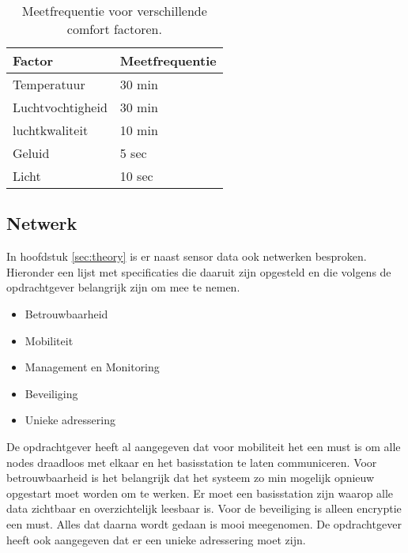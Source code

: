 \begin{table}[h]
    \centering
    \begin{tabular}{|l|l|}\hline
        Factor           & Meetfrequentie\\\hline
        Temperatuur      & 30 min        \\\hline
        Luchtvochtigheid & 30 min        \\\hline
        luchtkwaliteit   & 10 min        \\\hline
        Geluid           & 5 sec         \\\hline
        Licht            & 10 sec        \\\hline
    \end{tabular}
    \caption{Meetfrequentie voor verschillende comfort factoren.}
    \label{tabel:meetfrequentie}
\end{table}

\subsection{Netwerk}
In hoofdstuk \ref{sec:theory} is er naast sensor data ook netwerken besproken. Hieronder een lijst met specificaties die daaruit zijn 
opgesteld en die volgens de opdrachtgever belangrijk zijn om mee te nemen.
\begin{itemize}
    \item Betrouwbaarheid
    \item Mobiliteit
    \item Management en Monitoring
    \item Beveiliging
    \item Unieke adressering
\end{itemize}

De opdrachtgever heeft al aangegeven dat voor mobiliteit het een must is om alle nodes draadloos met elkaar en het basisstation te laten communiceren.
Voor betrouwbaarheid is het belangrijk dat het systeem zo min mogelijk opnieuw opgestart moet worden om te werken.
Er moet een basisstation zijn waarop alle data zichtbaar en overzichtelijk leesbaar is. 
Voor de beveiliging is alleen encryptie een must. Alles dat daarna wordt gedaan is mooi meegenomen.
De opdrachtgever heeft ook aangegeven dat er een unieke adressering moet zijn.
